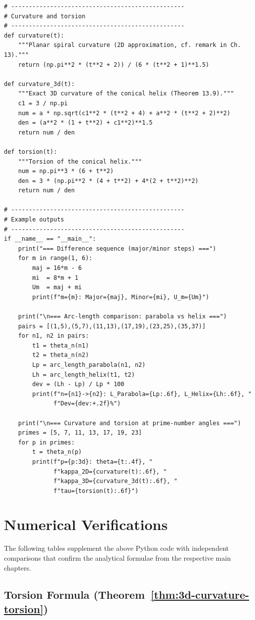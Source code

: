 \begin{verbatim}
# -------------------------------------------------
# Curvature and torsion
# -------------------------------------------------
def curvature(t):
    """Planar spiral curvature (2D approximation, cf. remark in Ch. 13)."""
    return (np.pi**2 * (t**2 + 2)) / (6 * (t**2 + 1)**1.5)

def curvature_3d(t):
    """Exact 3D curvature of the conical helix (Theorem 13.9)."""
    c1 = 3 / np.pi
    num = a * np.sqrt(c1**2 * (t**2 + 4) + a**2 * (t**2 + 2)**2)
    den = (a**2 * (1 + t**2) + c1**2)**1.5
    return num / den

def torsion(t):
    """Torsion of the conical helix."""
    num = np.pi**3 * (6 + t**2)
    den = 3 * (np.pi**2 * (4 + t**2) + 4*(2 + t**2)**2)
    return num / den

# -------------------------------------------------
# Example outputs
# -------------------------------------------------
if __name__ == "__main__":
    print("=== Difference sequence (major/minor steps) ===")
    for m in range(1, 6):
        maj = 16*m - 6
        mi  = 8*m + 1
        Um  = maj + mi
        print(f"m={m}: Major={maj}, Minor={mi}, U_m={Um}")

    print("\n=== Arc-length comparison: parabola vs helix ===")
    pairs = [(1,5),(5,7),(11,13),(17,19),(23,25),(35,37)]
    for n1, n2 in pairs:
        t1 = theta_n(n1)
        t2 = theta_n(n2)
        Lp = arc_length_parabola(n1, n2)
        Lh = arc_length_helix(t1, t2)
        dev = (Lh - Lp) / Lp * 100
        print(f"n={n1}->{n2}: L_Parabola={Lp:.6f}, L_Helix={Lh:.6f}, "
              f"Dev={dev:+.2f}%")

    print("\n=== Curvature and torsion at prime-number angles ===")
    primes = [5, 7, 11, 13, 17, 19, 23]
    for p in primes:
        t = theta_n(p)
        print(f"p={p:3d}: theta={t:.4f}, "
              f"kappa_2D={curvature(t):.6f}, "
              f"kappa_3D={curvature_3d(t):.6f}, "
              f"tau={torsion(t):.6f}")
\end{verbatim}

\section{Numerical Verifications}

The following tables supplement the above Python code with independent
comparisons that confirm the analytical formulae from the respective
main chapters.

\subsection{Torsion Formula (Theorem~\ref{thm:3d-curvature-torsion})} 

